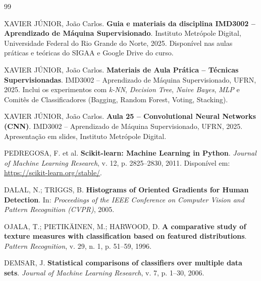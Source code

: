 \documentclass[12pt]{article}
\begin{document}
\begin{thebibliography}{99}

XAVIER JÚNIOR, João Carlos. \textbf{Guia e materiais da disciplina IMD3002 – Aprendizado de Máquina Supervisionado}.  
Instituto Metrópole Digital, Universidade Federal do Rio Grande do Norte, 2025.  
Disponível nas aulas práticas e teóricas do SIGAA e Google Drive do curso.

XAVIER JÚNIOR, João Carlos. \textbf{Materiais de Aula Prática – Técnicas Supervisionadas}.  
IMD3002 – Aprendizado de Máquina Supervisionado, UFRN, 2025.  
Inclui os experimentos com \textit{k-NN}, \textit{Decision Tree}, \textit{Naive Bayes}, \textit{MLP} e Comitês de Classificadores (Bagging, Random Forest, Voting, Stacking).

XAVIER JÚNIOR, João Carlos. \textbf{Aula 25 – Convolutional Neural Networks (CNN)}.  
IMD3002 – Aprendizado de Máquina Supervisionado, UFRN, 2025.  
Apresentação em slides, Instituto Metrópole Digital.

PEDREGOSA, F. et al. \textbf{Scikit-learn: Machine Learning in Python}.  
\textit{Journal of Machine Learning Research}, v. 12, p. 2825–2830, 2011.  
Disponível em: \url{https://scikit-learn.org/stable/}.

DALAL, N.; TRIGGS, B. \textbf{Histograms of Oriented Gradients for Human Detection}.  
In: \textit{Proceedings of the IEEE Conference on Computer Vision and Pattern Recognition (CVPR)}, 2005.

OJALA, T.; PIETIKÄINEN, M.; HARWOOD, D. \textbf{A comparative study of texture measures with classification based on featured distributions}.  
\textit{Pattern Recognition}, v. 29, n. 1, p. 51–59, 1996.

DEMSAR, J. \textbf{Statistical comparisons of classifiers over multiple data sets}.  
\textit{Journal of Machine Learning Research}, v. 7, p. 1–30, 2006.

\end{thebibliography}
\end{document}
